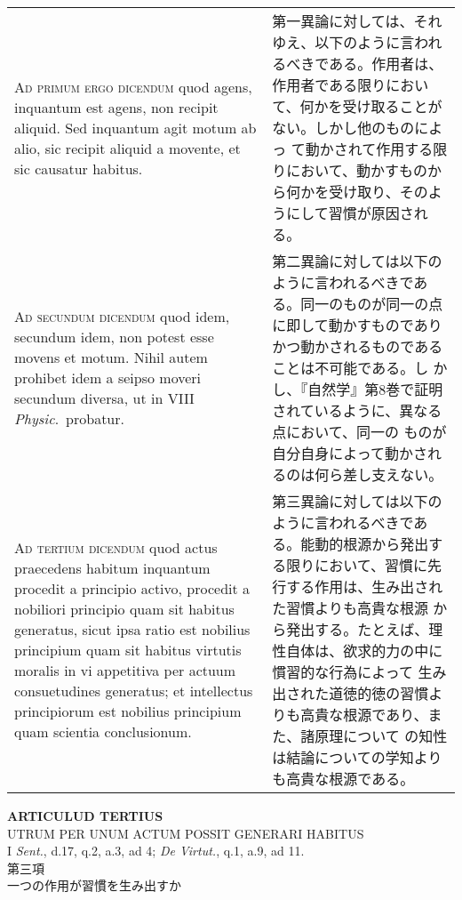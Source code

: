 \documentclass[10pt]{jsarticle} %
\begin{document}
\begin{longtable}{p{21em}p{21em}}
\\




{\scshape Ad primum ergo dicendum} quod agens, inquantum est agens, non recipit
 aliquid. Sed inquantum agit motum ab alio, sic recipit aliquid a
 movente, et sic causatur habitus.

&

第一異論に対しては、それゆえ、以下のように言われるべきである。作用者は、
作用者である限りにおいて、何かを受け取ることがない。しかし他のものによっ
て動かされて作用する限りにおいて、動かすものから何かを受け取り、そのよ
うにして習慣が原因される。

\\




{\scshape Ad secundum dicendum} quod idem, secundum idem, non potest esse movens
 et motum. Nihil autem prohibet idem a seipso moveri secundum diversa,
 ut in VIII {\itshape Physic}.~probatur.

&

第二異論に対しては以下のように言われるべきである。同一のものが同一の点
に即して動かすものでありかつ動かされるものであることは不可能である。し
かし、『自然学』第8巻で証明されているように、異なる点において、同一の
ものが自分自身によって動かされるのは何ら差し支えない。

\\




{\scshape Ad tertium dicendum} quod actus praecedens habitum inquantum procedit a
 principio activo, procedit a nobiliori principio quam sit habitus
 generatus, sicut ipsa ratio est nobilius principium quam sit habitus
 virtutis moralis in vi appetitiva per actuum consuetudines generatus;
 et intellectus principiorum est nobilius principium quam scientia
 conclusionum.

&

第三異論に対しては以下のように言われるべきである。能動的根源から発出す
る限りにおいて、習慣に先行する作用は、生み出された習慣よりも高貴な根源
から発出する。たとえば、理性自体は、欲求的力の中に慣習的な行為によって
生み出された道徳的徳の習慣よりも高貴な根源であり、また、諸原理について
の知性は結論についての学知よりも高貴な根源である。

\\



\end{longtable}
\newpage

\begin{center}
{\Large {\bf ARTICULUD TERTIUS}}\\
{\large UTRUM PER UNUM ACTUM POSSIT GENERARI HABITUS}\\
{\footnotesize I {\itshape Sent.}, d.17, q.2, a.3, ad 4; {\itshape De Virtut.}, q.1, a.9, ad 11.}\\
{\Large 第三項\\一つの作用が習慣を生み出すか}
\end{center}
\end{document}
